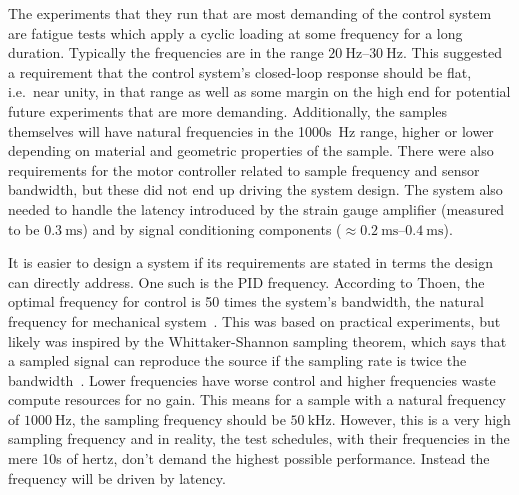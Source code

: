 \documentclass[english,12pt,a4paper,pdftex,eng,utf8]{aaltothesis}
\newcommand\ie{i.e.\ }
\begin{document}
The experiments that they run that are most demanding of the control system are fatigue tests which apply a cyclic loading at some frequency for a long duration.  Typically the frequencies are in the range $\qtyrange[range-units=single,range-phrase=..]{20}{30}{\hertz}$.  This suggested a requirement that the control system's closed-loop response should be flat, \ie near unity, in that range as well as some margin on the high end for potential future experiments that are more demanding.  Additionally, the samples themselves will have natural frequencies in the 1000s~Hz range, higher or lower depending on material and geometric properties of the sample.  There were also requirements for the motor controller related to sample frequency and sensor bandwidth, but these did not end up driving the system design.  The system also needed to handle the latency introduced by the strain gauge amplifier (measured to be $\qty{0.3}{\milli\second}$) and by signal conditioning components ($\approx\qtyrange[range-units=single,range-phrase=..]{0.2}{0.4}{\milli\second}$).

It is easier to design a system if its requirements are stated in terms the design can directly address.  One such is the PID frequency.  According to Thoen, the optimal frequency for control is 50 times the system's bandwidth, the natural frequency for mechanical system~\cite{Thoen2021}.  This was based on practical experiments, but likely was inspired by the Whittaker-Shannon sampling theorem, which says that a sampled signal can reproduce the source if the sampling rate is twice the bandwidth~\cite{Whittaker1915,Shannon1949}.  Lower frequencies have worse control and higher frequencies waste compute resources for no gain.  This means for a sample with a natural frequency of $\qty{1000}{\hertz}$, the sampling frequency should be $\qty{50}{\kilo\hertz}$.  However, this is a very high sampling frequency and in reality, the test schedules, with their frequencies in the mere 10s of hertz, don't demand the highest possible performance.  Instead the frequency will be driven by latency.
\end{document}

